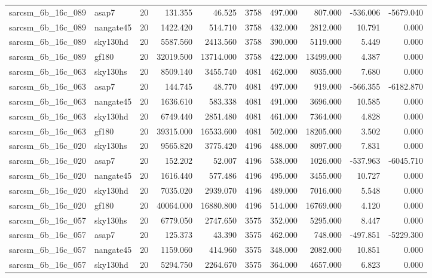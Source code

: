 \documentclass{article}
\begin{document}
\begin{longtable}{llrrrrrrrr}
sarcsm\_6b\_16c\_089 & asap7 & 20 & 131.355 & 46.525 & 3758 & 497.000 & 807.000 & -536.006 & -5679.040 \\
sarcsm\_6b\_16c\_089 & nangate45 & 20 & 1422.420 & 514.710 & 3758 & 432.000 & 2812.000 & 10.791 & 0.000 \\
sarcsm\_6b\_16c\_089 & sky130hd & 20 & 5587.560 & 2413.560 & 3758 & 390.000 & 5119.000 & 5.449 & 0.000 \\
sarcsm\_6b\_16c\_089 & gf180 & 20 & 32019.500 & 13714.000 & 3758 & 422.000 & 13499.000 & 4.387 & 0.000 \\
sarcsm\_6b\_16c\_063 & sky130hs & 20 & 8509.140 & 3455.740 & 4081 & 462.000 & 8035.000 & 7.680 & 0.000 \\
sarcsm\_6b\_16c\_063 & asap7 & 20 & 144.745 & 48.770 & 4081 & 497.000 & 919.000 & -566.355 & -6182.870 \\
sarcsm\_6b\_16c\_063 & nangate45 & 20 & 1636.610 & 583.338 & 4081 & 491.000 & 3696.000 & 10.585 & 0.000 \\
sarcsm\_6b\_16c\_063 & sky130hd & 20 & 6749.440 & 2851.480 & 4081 & 461.000 & 7364.000 & 4.828 & 0.000 \\
sarcsm\_6b\_16c\_063 & gf180 & 20 & 39315.000 & 16533.600 & 4081 & 502.000 & 18205.000 & 3.502 & 0.000 \\
sarcsm\_6b\_16c\_020 & sky130hs & 20 & 9565.820 & 3775.420 & 4196 & 488.000 & 8097.000 & 7.831 & 0.000 \\
sarcsm\_6b\_16c\_020 & asap7 & 20 & 152.202 & 52.007 & 4196 & 538.000 & 1026.000 & -537.963 & -6045.710 \\
sarcsm\_6b\_16c\_020 & nangate45 & 20 & 1616.440 & 577.486 & 4196 & 495.000 & 3455.000 & 10.727 & 0.000 \\
sarcsm\_6b\_16c\_020 & sky130hd & 20 & 7035.020 & 2939.070 & 4196 & 489.000 & 7016.000 & 5.548 & 0.000 \\
sarcsm\_6b\_16c\_020 & gf180 & 20 & 40064.000 & 16880.800 & 4196 & 514.000 & 16769.000 & 4.120 & 0.000 \\
sarcsm\_6b\_16c\_057 & sky130hs & 20 & 6779.050 & 2747.650 & 3575 & 352.000 & 5295.000 & 8.447 & 0.000 \\
sarcsm\_6b\_16c\_057 & asap7 & 20 & 125.373 & 43.390 & 3575 & 462.000 & 748.000 & -497.851 & -5229.300 \\
sarcsm\_6b\_16c\_057 & nangate45 & 20 & 1159.060 & 414.960 & 3575 & 348.000 & 2082.000 & 10.851 & 0.000 \\
sarcsm\_6b\_16c\_057 & sky130hd & 20 & 5294.750 & 2264.670 & 3575 & 364.000 & 4657.000 & 6.823 & 0.000 \\

\end{longtable}
\end{document}
